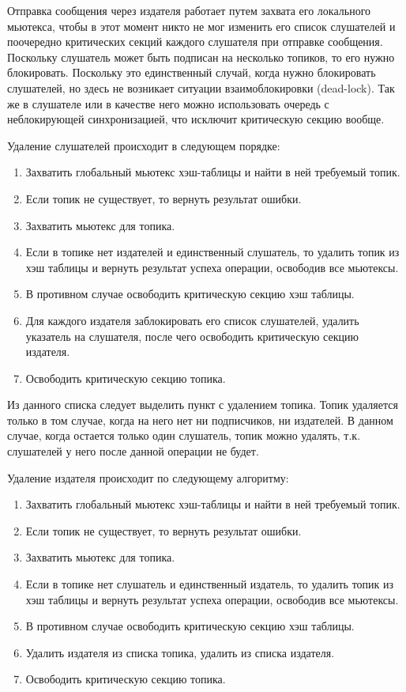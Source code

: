 Отправка сообщения через издателя работает путем захвата его локального мьютекса, чтобы в этот момент никто не мог изменить его список слушателей и поочередно критических секций каждого слушателя при отправке сообщения. Поскольку слушатель может быть подписан на несколько топиков, то его нужно блокировать. Поскольку это единственный случай, когда нужно блокировать слушателей, но здесь не возникает ситуации взаимоблокировки (dead-lock). Так же в слушателе или в качестве него можно использовать очередь с неблокирующей синхронизацией, что исключит критическую секцию вообще.

Удаление слушателей происходит в следующем порядке:

\begin{enumerate}
	\item Захватить глобальный мьютекс хэш-таблицы и найти в ней требуемый топик.
	\item Если топик не существует, то вернуть результат ошибки.
	\item Захватить мьютекс для топика.
	\item Если в топике нет издателей и единственный слушатель, то удалить топик из хэш таблицы и вернуть результат успеха операции, освободив все мьютексы.
	\item В противном случае освободить критическую секцию хэш таблицы.
	\item Для каждого издателя заблокировать его список слушателей, удалить указатель на слушателя, после чего освободить критическую секцию издателя.
	\item Освободить критическую секцию топика.
\end{enumerate}

Из данного списка следует выделить пункт с удалением топика. Топик удаляется только в том случае, когда на него нет ни подписчиков, ни издателей. В данном случае, когда остается только один слушатель, топик можно удалять, т.к. слушателей у него после данной операции не будет.

Удаление издателя происходит по следующему алгоритму:

\begin{enumerate}
	\item Захватить глобальный мьютекс хэш-таблицы и найти в ней требуемый топик.
	\item Если топик не существует, то вернуть результат ошибки.
	\item Захватить мьютекс для топика.
	\item Если в топике нет слушатель и единственный издатель, то удалить топик из хэш таблицы и вернуть результат успеха операции, освободив все мьютексы.
	\item В противном случае освободить критическую секцию хэш таблицы.
	\item Удалить издателя из списка топика, удалить из списка издателя.
	\item Освободить критическую секцию топика.
\end{enumerate}

